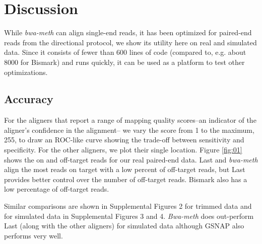 \documentclass{bioinfo}
\begin{document}
\section{Discussion}

While \textit{bwa-meth} can align single-end reads, it has been optimized for
paired-end reads from the directional protocol, we show its utility here on real
and simulated data. Since it consists
of fewer than 600 lines of code (compared to, e.g. about 8000 for Bismark) and runs
quickly, it can be used as a platform to test other optimizations.

\subsection{Accuracy}
For the aligners that report a range of mapping quality
scores--an indicator of the aligner's confidence in the alignment--
we vary the score from 1 to the maximum, 255, to draw an ROC-like
curve showing the trade-off between sensitivity and specificity. For the
other aligners, we plot their single location. Figure \ref{fig:01} shows
the on and off-target reads for our real paired-end data. Last and 
\textit{bwa-meth} align the most reads on target with a low percent
of off-target reads, but Last provides better control over the number
of off-target reads. Bismark also has a low percentage of off-target reads.

Similar comparisons are shown in  Supplemental Figures 2
for trimmed data and for simulated data in Supplemental Figures 3 and 4.
\textit{Bwa-meth} does out-perform Last (along with the other aligners)
for simulated data although GSNAP also performs very well.
\end{document}
